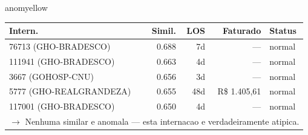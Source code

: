 \documentclass[a4paper,10pt]{article}
\begin{document}
\begin{anomalycard}[Internacao 149418 | PASA | MODERADO (z=2.32)]{anomyellow}
\begin{tabular}{l r r r l}\toprule\textbf{Intern.} & \textbf{Simil.} & \textbf{LOS} & \textbf{Faturado} & \textbf{Status} \\\midrule
76713 (GHO-BRADESCO) & 0.688 & 7d & --- & \textcolor{jcubeblue}{normal} \\
111941 (GHO-BRADESCO) & 0.663 & 4d & --- & \textcolor{jcubeblue}{normal} \\
3667 (GOHOSP-CNU) & 0.656 & 3d & --- & \textcolor{jcubeblue}{normal} \\
5777 (GHO-REALGRANDEZA) & 0.655 & 48d & R\$ 1.405,61 & \textcolor{jcubeblue}{normal} \\
117001 (GHO-BRADESCO) & 0.650 & 4d & --- & \textcolor{jcubeblue}{normal} \\
\multicolumn{5}{l}{\textcolor{jcubeblue}{\small $\rightarrow$ Nenhuma similar e anomala --- esta internacao e verdadeiramente atipica.}} \\
\bottomrule\end{tabular}



\end{anomalycard}

\newpage
\end{document}
